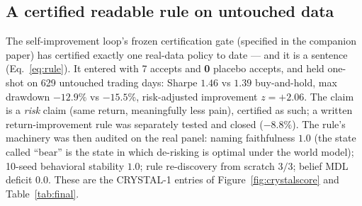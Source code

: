 \documentclass[11pt]{article}
\begin{document}
\subsection{A certified readable rule on untouched data}
\label{sec:cert}

The self-improvement loop's frozen certification gate (specified in the companion paper) has
certified exactly one real-data policy to date --- and it is a sentence (Eq.~\ref{eq:rule}). It
entered with 7 accepts and \textbf{0} placebo accepts, and held one-shot on 629 untouched
trading days: Sharpe $1.46$ vs $1.39$ buy-and-hold, max drawdown $-12.9\%$ vs $-15.5\%$,
risk-adjusted improvement $z = +2.06$. The claim is a \emph{risk} claim (same return,
meaningfully less pain), certified as such; a written return-improvement rule was separately
tested and closed ($-8.8\%$). The rule's machinery was then audited on the real panel: naming
faithfulness $1.0$ (the state called ``bear'' is the state in which de-risking is optimal under
the world model); 10-seed behavioral stability $1.0$; rule re-discovery from scratch $3/3$;
belief MDL deficit $0.0$. These are the CRYSTAL-1 entries of Figure~\ref{fig:crystalscore} and
Table~\ref{tab:final}.
\end{document}
